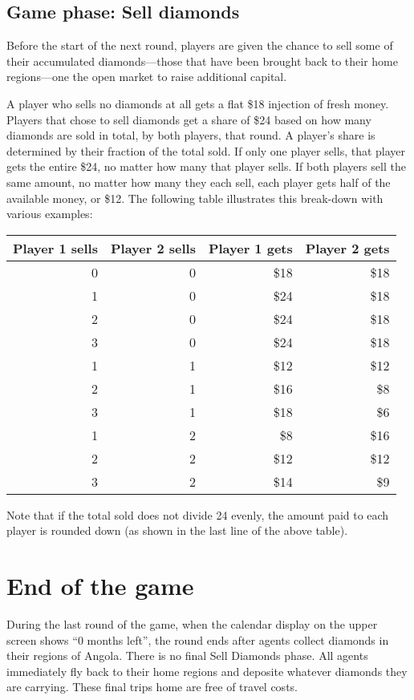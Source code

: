 \documentclass[8pt]{extbook}
\begin{document}
\subsection{Game phase:  Sell diamonds}
\label{sec:sellPhase}

Before the start of the next round, players are given the chance to sell some of their accumulated diamonds---those that have been brought back to their home regions---one the open market to raise additional capital.

A player who sells no diamonds at all gets a flat \$18 injection of fresh money.  Players that chose to sell diamonds get a share of \$24 based on how many diamonds are sold in total, by both players, that round.  A player's share is determined by their fraction of the total sold.  If only one player sells, that player gets the entire \$24, no matter how many that player sells.  If both players sell the same amount, no matter how many they each sell, each player gets half of the available money, or \$12.  The following table illustrates this break-down with various examples:
\begin{center}
\begin{tabular}{r|r||r|r}
Player 1 sells & Player 2 sells & Player 1 gets & Player 2 gets\\
\hline
\hline
0 & 0 & \$18 & \$18 \\
\hline
1 & 0 & \$24 & \$18 \\
2 & 0 & \$24 & \$18 \\
3 & 0 & \$24 & \$18 \\
\hline
1 & 1 & \$12 & \$12 \\
2 & 1 & \$16 & \$8 \\
3 & 1 & \$18 & \$6 \\
\hline
1 & 2 & \$8 & \$16 \\
2 & 2 & \$12 & \$12 \\
3 & 2 & \$14 & \$9 \\
\end{tabular} 
\end{center}
Note that if the total sold does not divide 24 evenly, the amount paid to each player is rounded down (as shown in the last line of the above table).


\section{End of the game}

During the last round of the game, when the calendar display on the upper screen shows ``0 months left'', the round ends after agents collect diamonds in their regions of Angola.  There is no final Sell Diamonds phase.  All agents immediately fly back to their home regions and deposite whatever diamonds they are carrying.  These final trips home are free of travel costs.
\end{document}
